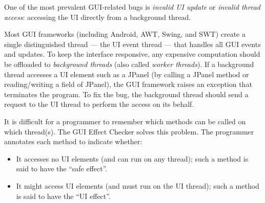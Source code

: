 
One of the most prevalent GUI-related bugs is \emph{invalid UI update} or \emph{invalid thread access}:  accessing the UI directly from a
background thread.



Most GUI frameworks (including Android, AWT, Swing, and SWT) create
a single distinguished thread --- the UI event thread
--- that handles all GUI events and updates.
To keep the interface responsive, any expensive computation should be
offloaded to \emph{background threads} (also called \emph{worker threads}).
If a background thread accesses a UI
element such as a JPanel (by calling a JPanel method or reading/writing a
field of JPanel),
the GUI framework raises an exception that terminates the program.
To fix the bug, the background thread should send a request to the
UI thread to perform the access on its behalf.

It is difficult for a programmer to remember which methods can be called on
which thread(s).
The GUI Effect Checker solves this problem.
The programmer annotates each method to indicate whether:
\begin{itemize}
\item
  It accesses no UI elements (and can run on any thread);
  such a method is said to have the ``safe effect''.
\item
  It might access UI elements (and must run on the UI thread);
  such a method is said to have the ``UI effect''.
\end{itemize}


